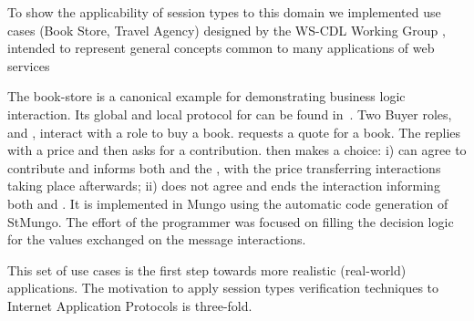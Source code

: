 To show the applicability of session types to
this domain we implemented use cases
(Book Store, Travel Agency) designed by the WS-CDL Working Group \cite{W3C},
intended to represent general concepts common to many applications of web services

The book-store is a canonical example for demonstrating 
business logic interaction.
Its global and  local protocol for \BuyerOne
can be found in~. Two
Buyer roles, \BuyerOne and \BuyerTwo, interact with a \Seller
role to buy a book. \BuyerOne requests a quote for a book.
The \Seller replies with a price and then \BuyerOne asks
\BuyerTwo for a contribution. \BuyerTwo then makes a choice:
i) \BuyerTwo can agree to contribute and informs both \BuyerOne
and the \Seller, with the price transferring interactions taking
place afterwards; ii) \BuyerTwo does not agree and ends the interaction
informing both \BuyerOne and \Seller.
%
It is implemented in Mungo using the automatic code generation of
StMungo. The effort of the programmer was focused on filling the
decision logic for the values exchanged on the message interactions.




This set of use cases is the first step towards
more realistic (real-world) applications.
The motivation to apply session types verification
techniques to Internet Application Protocols is three-fold.

